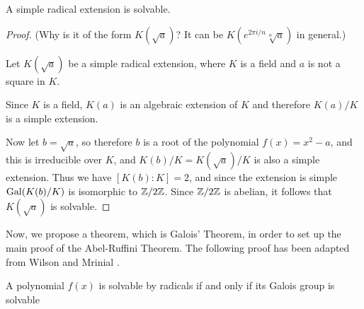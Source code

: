 \begin{lemma}\label{lemma:solvable-radical-extension}
    A simple radical extension is solvable.
\end{lemma}

\begin{proof}
	    
	(\TODO Why is it of the form $K(\sqrt{a})$? It can be $K(e^{2\pi i / n}\sqrt[n]{a})$ in general.)
	
    Let $K(\sqrt{a})$ be a simple radical extension, where $K$ is a field and $a$ is not a square in $K$.

    Since $K$ is a field, $K(a)$ is an algebraic extension of $K$ and therefore $K(a)/K$ is a simple extension.
    
    \noindent
    Now let $b=\sqrt{a}$, so therefore $b$ is a root of the polynomial $f(x)=x^2-a$, and this is irreducible over $K$, and $K(b)/K = K(\sqrt{a})/K$ is also a simple extension. Thus we have $[K(b):K]=2$, and since the extension is simple $\operatorname{Gal}(K(b)/K)$ is isomorphic to $\mathbb Z/2\mathbb Z$. Since $\mathbb Z/2\mathbb Z$ is abelian, it follows that $K(\sqrt{a})$ is solvable.
\end{proof}

\noindent
Now, we propose a theorem, which is Galois' Theorem, in order to set up the main proof of the Abel-Ruffini Theorem. The following proof has been adapted from Wilson \cite{cambridge-galois-lecture-polynomials} and Mrinial \cite{Abel-Ruffini}.

\begin{theorem}\label{thm:galois-theorem}
     A polynomial $f(x)$ is solvable by radicals if and only if its Galois group is solvable
\end{theorem}

